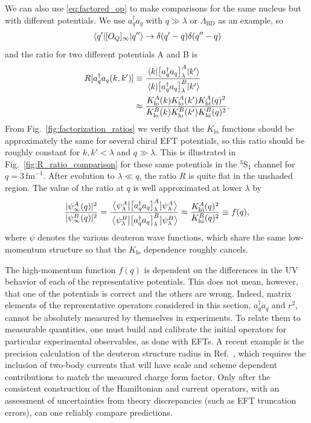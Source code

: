 \documentclass[10pt,aps,prc,floatfix,twocolumn,nofootinbib]{revtex4-1}
\newcommand{\LambdaBD}{{\Lambda_{\text{BD}}}}
\newcommand{\ataq}{a^{\dagger}_q a_q}
\newcommand{\Klo}{K_{\text{lo}}}
\newcommand{\Khi}{K_{\text{hi}}}
\begin{document}
We can also use \eqref{eq:factored_op} to make comparisons for the same nucleus but with different potentials.
We use $\ataq$ with $q \gg \lambda$ or $\LambdaBD$ as an example, so 
%
\begin{align}
    \mel{q'}{[O_Q]_\infty}{q''} \rightarrow \delta(q'-q)\delta(q''-q)
\end{align}
%
and  the ratio for two different potentials A and B is
%
\begin{align}
	\label{eq:momentum_proj_matrix_elements_ratio}
	R[\ataq(k,k')] &\equiv
	\frac{\mel{k}{\bigl[\ataq\bigr]^A_{\lambda}}{k'}}
	{\mel{k}{\bigl[\ataq\bigr]^B_{\lambda}}{k'}} 
	\notag \\
   &\approx \frac{\Klo^A(k)\Klo^A(k') \Khi^A(q)^2}
             {\Klo^B(k)\Klo^B(k') \Khi^B(q)^2}
   .
\end{align}
%
From Fig.~\ref{fig:factorization_ratios} we verify that the $\Klo$ functions should be approximately the same for several chiral EFT potentials, so this ratio should be roughly constant for $k,k' < \lambda$ and $q \gg \lambda$.
This is illustrated in Fig.~\ref{fig:R_ratio_comparison} for these same potentials in the $^3$S$_1$ channel for $q = 3\,\mbox{fm}^{-1}$.
After evolution to $\lambda \ll q$, the ratio $R$ is quite flat in the unshaded region.
The value of the ratio at $q$ is well approximated at lower $\lambda$ by
%
\begin{align}
    \label{eq:momentum_proj_factorization_ratio}
    \frac{|\psi^A_{\infty}(q)|^2}{|\psi^B_{\infty}(q)|^2} =
	\frac{\mel{\psi^A_\lambda}{\bigl[\ataq\bigr]^A_{\lambda}}{\psi^A_\lambda}}
	{\mel{\psi^B_\lambda}{\bigl[\ataq\bigr]^B_{\lambda}}{\psi^B_\lambda}} 
	\approx \frac{\Khi^A(q)^2}
             { \Khi^B(q)^2}
    \equiv f(q),
\end{align}
%
where $\psi$ denotes the various deuteron wave functions, which share the same low-momentum structure so that the $\Klo$ dependence roughly cancels.

The high-momentum function $f(q)$ is dependent on the differences in the UV behavior of each of the representative potentials.
This does not mean, however, that one of the potentials is correct and the others are wrong.
Indeed, matrix elements of the representative operators considered in this section, $\ataq$ and $r^2$, cannot be absolutely measured by themselves in experiments. 
To relate them to measurable quantities, one must build and calibrate the initial operators for particular experimental observables, as done with EFTs.
A recent example is the precision calculation of the deuteron structure radius in Ref.~\cite{Filin:2019eoe}, which requires the inclusion of two-body currents that will have scale and scheme dependent contributions to match the measured charge form factor.
Only after the consistent construction of the Hamiltonian and current operators, with an assessment of uncertainties from theory discrepancies (such as EFT truncation errors), can one reliably compare predictions. 
\end{document}
